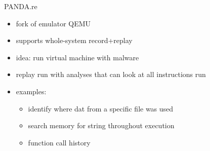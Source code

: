 \begin{frame}{PANDA.re}
    \begin{itemize}
    \item fork of emulator QEMU
    \item supports whole-system record+replay
    \vspace{.5cm}
    \item idea: run virtual machine with malware
    \item replay run with analyses that can look at all instructions run
    \item examples:
        \begin{itemize}
        \item identify where dat from a specific file was used
        \item search memory for string throughout execution
        \item function call history
        \end{itemize}
    \end{itemize}
\end{frame}
